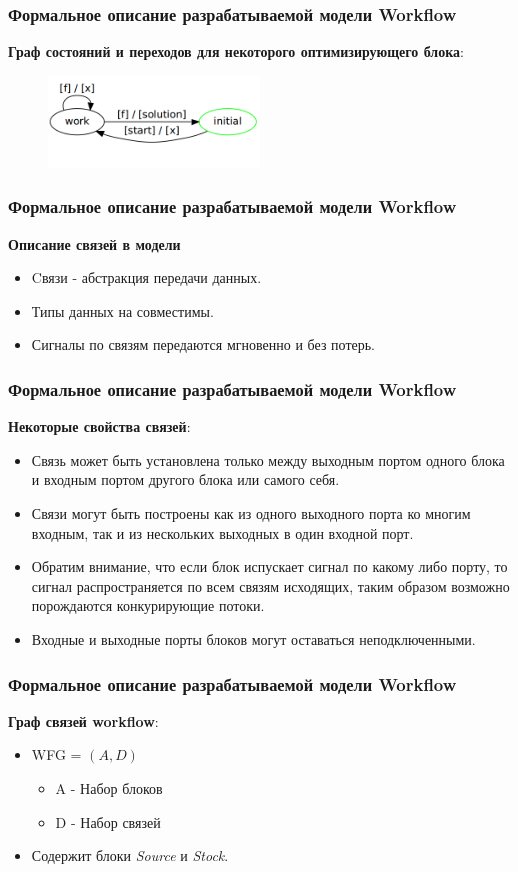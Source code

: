\documentclass[10pt,pdf,hyperref={unicode}]{beamer}
\begin{document}
\begin{frame}
\frametitle{Формальное описание разрабатываемой модели Workflow}

\textbf{Граф состояний и переходов для некоторого оптимизирующего блока}:
\begin{figure}[here]
    \centering
    \includegraphics[width=0.5\textwidth]{optimizer_block.png}
\end{figure}  
\end{frame}


\begin{frame}
\frametitle{Формальное описание разрабатываемой модели Workflow}
\textbf{Описание связей в модели}
\begin{itemize}
\item<1-> Cвязи - абстракция передачи данных.
\item<2-> Типы данных на совместимы.
\item<3-> Сигналы по связям передаются мгновенно и без потерь.
\end{itemize} 

\end{frame}

\begin{frame}
\frametitle{Формальное описание разрабатываемой модели Workflow}
\textbf{Некоторые свойства связей}:
\begin{itemize}
\item<1-> Связь может быть установлена только между выходным портом одного блока и входным портом другого блока или самого себя.
\item<2-> Связи могут быть построены как из одного выходного порта ко многим входным, так и из нескольких выходных в один входной порт.
\item<3->Обратим внимание, что если блок испускает сигнал по какому либо порту, то сигнал распространяется по всем связям исходящих, таким образом возможно порождаются конкурирующие потоки.
\item<4-> Входные и выходные порты блоков могут оставаться неподключенными.
\end{itemize} 
\end{frame}

\begin{frame}
\frametitle{Формальное описание разрабатываемой модели Workflow}
\textbf{Граф связей workflow}:
 \begin{itemize}
 \item WFG = $(A, D)$
 \begin{itemize}
 \item A - Набор блоков
 \item D - Набор связей
 \end{itemize} 
 \item<2-> Содержит блоки \textit{Source} и \textit{Stock}.
\end{itemize} 
\end{frame}
\end{document}
